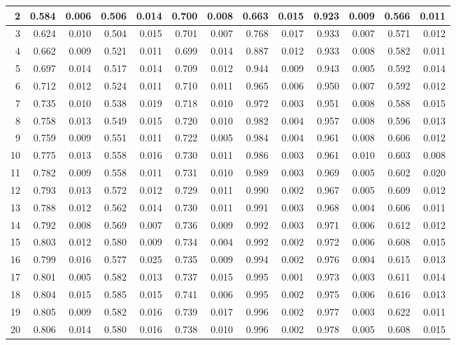 \documentclass[
]{article}
\begin{document}
\begin{table}[H]
\begin{table}
{\begin{tabular}{r|r|r|r|r|r|r|r|r|r|r|r|r}
\hline
2 & 0.584 & 0.006 & 0.506 & 0.014 & 0.700 & 0.008 & 0.663 & 0.015 & 0.923 & 0.009 & 0.566 & 0.011\\
\hline
3 & 0.624 & 0.010 & 0.504 & 0.015 & 0.701 & 0.007 & 0.768 & 0.017 & 0.933 & 0.007 & 0.571 & 0.012\\
\hline
4 & 0.662 & 0.009 & 0.521 & 0.011 & 0.699 & 0.014 & 0.887 & 0.012 & 0.933 & 0.008 & 0.582 & 0.011\\
\hline
5 & 0.697 & 0.014 & 0.517 & 0.014 & 0.709 & 0.012 & 0.944 & 0.009 & 0.943 & 0.005 & 0.592 & 0.014\\
\hline
6 & 0.712 & 0.012 & 0.524 & 0.011 & 0.710 & 0.011 & 0.965 & 0.006 & 0.950 & 0.007 & 0.592 & 0.012\\
\hline
7 & 0.735 & 0.010 & 0.538 & 0.019 & 0.718 & 0.010 & 0.972 & 0.003 & 0.951 & 0.008 & 0.588 & 0.015\\
\hline
8 & 0.758 & 0.013 & 0.549 & 0.015 & 0.720 & 0.010 & 0.982 & 0.004 & 0.957 & 0.008 & 0.596 & 0.013\\
\hline
9 & 0.759 & 0.009 & 0.551 & 0.011 & 0.722 & 0.005 & 0.984 & 0.004 & 0.961 & 0.008 & 0.606 & 0.012\\
\hline
10 & 0.775 & 0.013 & 0.558 & 0.016 & 0.730 & 0.011 & 0.986 & 0.003 & 0.961 & 0.010 & 0.603 & 0.008\\
\hline
11 & 0.782 & 0.009 & 0.558 & 0.011 & 0.731 & 0.010 & 0.989 & 0.003 & 0.969 & 0.005 & 0.602 & 0.020\\
\hline
12 & 0.793 & 0.013 & 0.572 & 0.012 & 0.729 & 0.011 & 0.990 & 0.002 & 0.967 & 0.005 & 0.609 & 0.012\\
\hline
13 & 0.788 & 0.012 & 0.562 & 0.014 & 0.730 & 0.011 & 0.991 & 0.003 & 0.968 & 0.004 & 0.606 & 0.011\\
\hline
14 & 0.792 & 0.008 & 0.569 & 0.007 & 0.736 & 0.009 & 0.992 & 0.003 & 0.971 & 0.006 & 0.612 & 0.012\\
\hline
15 & 0.803 & 0.012 & 0.580 & 0.009 & 0.734 & 0.004 & 0.992 & 0.002 & 0.972 & 0.006 & 0.608 & 0.015\\
\hline
16 & 0.799 & 0.016 & 0.577 & 0.025 & 0.735 & 0.009 & 0.994 & 0.002 & 0.976 & 0.004 & 0.615 & 0.013\\
\hline
17 & 0.801 & 0.005 & 0.582 & 0.013 & 0.737 & 0.015 & 0.995 & 0.001 & 0.973 & 0.003 & 0.611 & 0.014\\
\hline
18 & 0.804 & 0.015 & 0.585 & 0.015 & 0.741 & 0.006 & 0.995 & 0.002 & 0.975 & 0.006 & 0.616 & 0.013\\
\hline
19 & 0.805 & 0.009 & 0.582 & 0.016 & 0.739 & 0.017 & 0.996 & 0.002 & 0.977 & 0.003 & 0.622 & 0.011\\
\hline
20 & 0.806 & 0.014 & 0.580 & 0.016 & 0.738 & 0.010 & 0.996 & 0.002 & 0.978 & 0.005 & 0.608 & 0.015\\
\hline
\end{tabular}}
\end{table}
\end{table}
\end{document}
